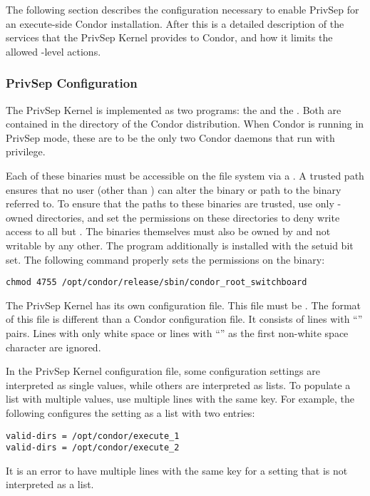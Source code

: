 The following section describes the configuration necessary
to enable PrivSep for an execute-side Condor installation.
After this is a detailed description of
the services that the PrivSep Kernel provides to Condor, and how it
limits the allowed -level actions.

\subsubsection{PrivSep Configuration}

The PrivSep Kernel is implemented as two programs:
the  and the .
Both are contained in
the  directory of the Condor distribution. When Condor is
running in PrivSep mode, these are to be the only two Condor daemons that run
with  privilege.

Each of these binaries must be accessible on the file system via a
. A trusted path ensures that no user (other than
) can alter the binary or path to the binary referred to.
To ensure that the
paths to these binaries are trusted, use only
-owned directories, and set the permissions on
these directories to deny write access to all but . 
The binaries themselves must also be owned by  
and not writable by any other.
The  program additionally
is installed with the setuid bit set. The following command
properly sets the permissions on the 
binary:
\begin{verbatim}
chmod 4755 /opt/condor/release/sbin/condor_root_switchboard
\end{verbatim}

The PrivSep Kernel has its own configuration file.
This file  must be .
The format of this file is different than 
a Condor configuration file.
It consists
of lines with ``'' pairs. 
Lines with only white space
or lines with ``\Code{\#}'' as the first non-white space character are ignored.

In the PrivSep Kernel configuration file,
some configuration settings are interpreted as single values, 
while others are interpreted as lists. 
To populate a list with multiple values,
use multiple lines with the same key.
For example, the following configures the 
setting as a list with two entries:
\begin{verbatim}
valid-dirs = /opt/condor/execute_1
valid-dirs = /opt/condor/execute_2
\end{verbatim}
It is an error to have multiple lines with the same key for a setting
that is not interpreted as a list.

